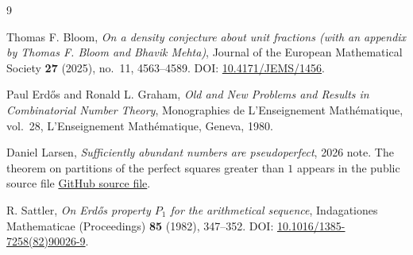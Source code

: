 \documentclass[11pt]{article}
\begin{document}
\begin{thebibliography}{9}

Thomas F. Bloom,
\emph{On a density conjecture about unit fractions (with an appendix by Thomas F. Bloom and Bhavik Mehta)},
Journal of the European Mathematical Society \textbf{27} (2025), no.~11, 4563--4589.
DOI: \href{https://doi.org/10.4171/JEMS/1456}{10.4171/JEMS/1456}.

Paul Erd\H{o}s and Ronald L. Graham,
\emph{Old and New Problems and Results in Combinatorial Number Theory},
Monographies de L'Enseignement Math\'ematique, vol.~28,
L'Enseignement Math\'ematique, Geneva, 1980.

Daniel Larsen,
\emph{Sufficiently abundant numbers are pseudoperfect},
2026 note.
The theorem on partitions of the perfect squares greater than $1$ appears in the public source file
\href{https://github.com/Larsen-Daniel/Erdos-318/blob/main/318.tex}{GitHub source file}.

R. Sattler,
\emph{On Erd\H{o}s property $P_1$ for the arithmetical sequence},
Indagationes Mathematicae (Proceedings) \textbf{85} (1982), 347--352.
DOI: \href{https://doi.org/10.1016/1385-7258(82)90026-9}{10.1016/1385-7258(82)90026-9}.

\end{thebibliography}
\end{document}
